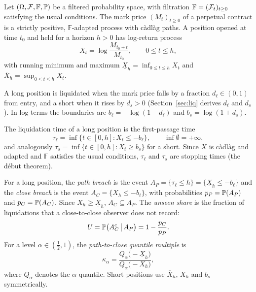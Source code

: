 Let $(\Omega,\mathcal{F},\mathbb{F},\mathbb{P})$ be a filtered probability space, with filtration
$\mathbb{F}=(\mathcal{F}_t)_{t\ge 0}$ satisfying the usual conditions. The mark price $(M_t)_{t\ge0}$ of a
perpetual contract is a strictly positive, $\mathbb{F}$-adapted process with c\`adl\`ag paths. A
position opened at time $t_0$ and held for a horizon $h>0$ has log-return process
\begin{equation}
X_t = \log\frac{M_{t_0+t}}{M_{t_0}}, \qquad 0\le t\le h,
\end{equation}
with running minimum and maximum $\underline{X}_h=\inf_{0\le t\le h}X_t$ and
$\overline{X}_h=\sup_{0\le t\le h}X_t$.

A long position is liquidated when the mark price falls by a fraction $d_\ell\in(0,1)$ from entry,
and a short when it rises by $d_s>0$ (Section~\ref{sec:liq} derives $d_\ell$ and $d_s$). In log terms
the boundaries are $b_\ell=-\log(1-d_\ell)$ and $b_s=\log(1+d_s)$.

\begin{definition}
The liquidation time of a long position is the first-passage time
\begin{equation}
\tau_\ell=\inf\{t\in[0,h]: X_t\le -b_\ell\}, \qquad \inf\emptyset=+\infty,
\end{equation}
and analogously $\tau_s=\inf\{t\in[0,h]:X_t\ge b_s\}$ for a short. Since $X$ is c\`adl\`ag and
adapted and $\mathbb{F}$ satisfies the usual conditions, $\tau_\ell$ and $\tau_s$ are stopping times
(the d\'ebut theorem).
\end{definition}

\begin{definition}
For a long position, the \emph{path breach} is the event $A_P=\{\tau_\ell\le h\}=\{\underline{X}_h\le
-b_\ell\}$ and the \emph{close breach} is the event $A_C=\{X_h\le -b_\ell\}$, with probabilities
$p_P=\mathbb{P}(A_P)$ and $p_C=\mathbb{P}(A_C)$. Since $X_h\ge\underline{X}_h$, $A_C\subseteq A_P$. The
\emph{unseen share} is the fraction of liquidations that a close-to-close observer does not record:
\begin{equation}
U=\mathbb{P}\big(A_C^{c}\,\big|\,A_P\big)=1-\frac{p_C}{p_P}.
\end{equation}
For a level $\alpha\in(\tfrac12,1)$, the \emph{path-to-close quantile multiple} is
\begin{equation}
\kappa_\alpha=\frac{Q_\alpha\big(-\underline{X}_h\big)}{Q_\alpha\big(-X_h\big)},
\end{equation}
where $Q_\alpha$ denotes the $\alpha$-quantile. Short positions use $\overline{X}_h$, $X_h$ and
$b_s$ symmetrically.
\end{definition}

